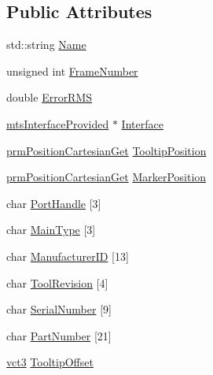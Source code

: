 \subsection*{Public Attributes}
\begin{DoxyCompactItemize}
\item 
std\+::string \hyperlink{classmts_n_d_i_serial_1_1_tool_a4c87311466326771f75531a83935c208}{Name}
\item 
unsigned int \hyperlink{classmts_n_d_i_serial_1_1_tool_a310bebd3b9eda41d482edbb983195a10}{Frame\+Number}
\item 
double \hyperlink{classmts_n_d_i_serial_1_1_tool_ad4282be66b1ffaf250d51fb9305395e7}{Error\+R\+M\+S}
\item 
\hyperlink{classmts_interface_provided}{mts\+Interface\+Provided} $\ast$ \hyperlink{classmts_n_d_i_serial_1_1_tool_ae39df6f4194b4be33310019ccee4bf73}{Interface}
\item 
\hyperlink{classprm_position_cartesian_get}{prm\+Position\+Cartesian\+Get} \hyperlink{classmts_n_d_i_serial_1_1_tool_aef4e9c123a79afda4c764d27faeac338}{Tooltip\+Position}
\item 
\hyperlink{classprm_position_cartesian_get}{prm\+Position\+Cartesian\+Get} \hyperlink{classmts_n_d_i_serial_1_1_tool_ab8a5ef4c88fdb0420aff4ef6354570bf}{Marker\+Position}
\item 
char \hyperlink{classmts_n_d_i_serial_1_1_tool_a9b445b958cbf2eb2058d1eb56df30da5}{Port\+Handle} \mbox{[}3\mbox{]}
\item 
char \hyperlink{classmts_n_d_i_serial_1_1_tool_a3b9ca4cfc7d81dc34e483a96e4a86056}{Main\+Type} \mbox{[}3\mbox{]}
\item 
char \hyperlink{classmts_n_d_i_serial_1_1_tool_ade34454fc0c511fefd3cd5db7332734b}{Manufacturer\+I\+D} \mbox{[}13\mbox{]}
\item 
char \hyperlink{classmts_n_d_i_serial_1_1_tool_aadd9c102dca4f53e5ea50188ddebc9e0}{Tool\+Revision} \mbox{[}4\mbox{]}
\item 
char \hyperlink{classmts_n_d_i_serial_1_1_tool_a454c6a43d24c1b0e50ff94b3f43e272a}{Serial\+Number} \mbox{[}9\mbox{]}
\item 
char \hyperlink{classmts_n_d_i_serial_1_1_tool_a80a1f0ea33d2f23349edb5fc58a4c388}{Part\+Number} \mbox{[}21\mbox{]}
\item 
\hyperlink{vct_fixed_size_vector_types_8h_a3af82acdbf4eeb73c551909240b106ea}{vct3} \hyperlink{classmts_n_d_i_serial_1_1_tool_aa8acfe8b5a76a1fc7816233d6f853049}{Tooltip\+Offset}
\end{DoxyCompactItemize}


